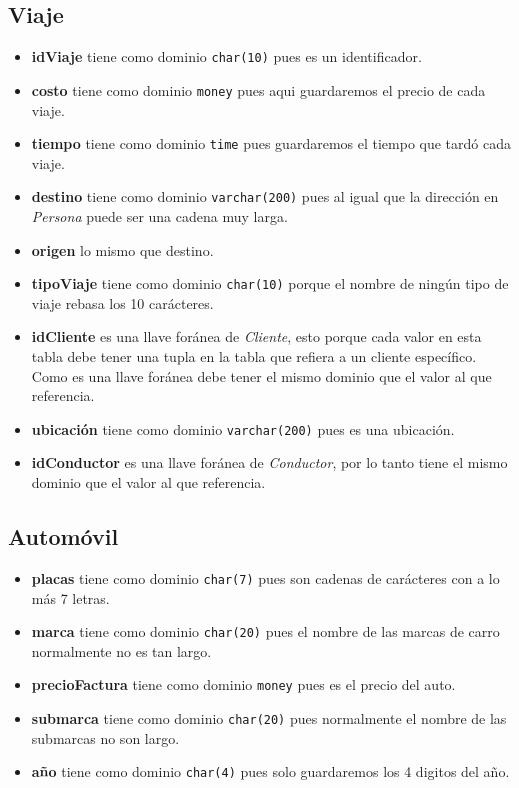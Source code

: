 \documentclass[11pt]{article}
\begin{document}
\subsection*{Viaje}
\label{sec:org36ac98a}
\begin{itemize}
\item \textbf{idViaje} tiene como dominio \texttt{char(10)} pues es un identificador.
\item \textbf{costo} tiene como dominio \texttt{money} pues aqui guardaremos el precio de cada viaje.
\item \textbf{tiempo} tiene como dominio \texttt{time} pues guardaremos el tiempo que tardó cada viaje.
\item \textbf{destino} tiene como dominio \texttt{varchar(200)} pues al igual que la dirección en \emph{Persona} puede ser una cadena muy larga.
\item \textbf{origen} lo mismo que destino.
\item \textbf{tipoViaje} tiene como dominio \texttt{char(10)} porque el nombre de ningún tipo de viaje rebasa los 10 carácteres.
\item \textbf{idCliente} es una llave foránea de \emph{Cliente}, esto porque cada valor en esta tabla debe tener una tupla
en la tabla que refiera a un cliente específico. Como es una llave foránea debe tener el mismo dominio que el valor al que referencia.
\item \textbf{ubicación} tiene como dominio \texttt{varchar(200)} pues es una ubicación.
\item \textbf{idConductor} es una llave foránea de \emph{Conductor}, por lo tanto tiene el mismo dominio que el valor al que referencia.
\end{itemize}
\subsection*{Automóvil}
\label{sec:org15c4b37}
\begin{itemize}
\item \textbf{placas} tiene como dominio \texttt{char(7)} pues son cadenas de carácteres con a lo más 7 letras.
\item \textbf{marca} tiene como dominio \texttt{char(20)} pues el nombre de las marcas de carro normalmente no es tan largo.
\item \textbf{precioFactura} tiene como dominio \texttt{money} pues es el precio del auto.
\item \textbf{submarca} tiene como dominio \texttt{char(20)} pues normalmente el nombre de las submarcas no son largo.
\item \textbf{año} tiene como dominio \texttt{char(4)} pues solo guardaremos los 4 digitos del año.
\end{itemize}
\end{document}
